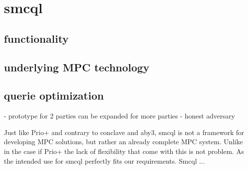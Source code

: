 \section{smcql}

\subsection{functionality}



\subsection{underlying MPC technology}


\subsection{querie optimization   }





- prototype for 2 parties can be expanded for more parties
- honest adversary


Just like Prio+ and contrary to conclave and aby3, smcql is not a framework for developing MPC solutions, but rather an already complete MPC system. Unlike in the case if Prio+ the lack of flexibility that come with this is not problem. As the intended use for smcql perfectly fits our requirements. Smcql ...
